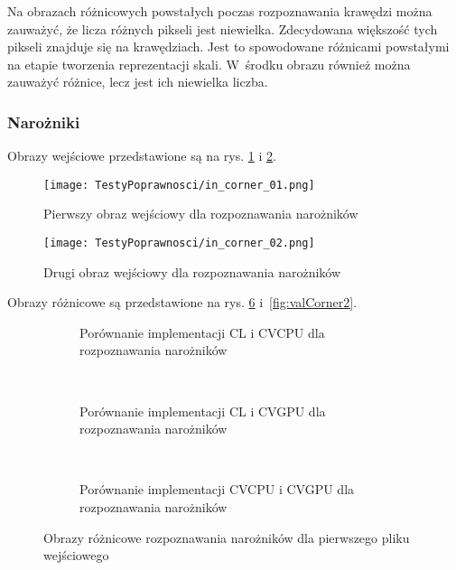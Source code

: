 Na obrazach różnicowych powstałych poczas rozpoznawania krawędzi można zauważyć, że licza różnych pikseli jest niewielka. Zdecydowana większość tych pikseli znajduje się na krawędziach. Jest to spowodowane różnicami powstałymi na etapie tworzenia reprezentacji skali. W~środku obrazu również można zauważyć różnice, lecz jest ich niewielka liczba.

\subsubsection{Narożniki}
\label{subsubsec:naroznikiRysunki}

Obrazy wejściowe przedstawione są na rys. \ref{fig:valCorner01} i \ref{fig:valCorner02}.

\begin{figure}[h]
\begin{center}
\texttt{[image: TestyPoprawnosci/in\_corner\_01.png]}
\end{center}
\caption{Pierwszy obraz wejściowy dla rozpoznawania narożników}
\label{fig:valCorner01}
\end{figure}

\begin{figure}[h]
\begin{center}
\texttt{[image: TestyPoprawnosci/in\_corner\_02.png]}
\end{center}
\caption{Drugi obraz wejściowy dla rozpoznawania narożników}
\label{fig:valCorner02}
\end{figure}

Obrazy różnicowe są przedstawione na rys. \ref{fig:valCorner1} i~\ref{fig:valCorner2}. 

\begin{figure}[h]
\begin{subfigure}[t]{0.3\textwidth}
	\centering
	\setlength\fboxsep{0pt}
	\setlength\fboxrule{0.5pt}
	\caption{Porównanie implementacji CL i CVCPU dla rozpoznawania narożników}
	\label{fig:valCorner1CLCVCPU}
\end{subfigure}
~
\begin{subfigure}[t]{0.3\textwidth}
	\centering
	\setlength\fboxsep{0pt}
	\setlength\fboxrule{0.5pt}
	\caption{Porównanie implementacji CL i CVGPU dla rozpoznawania narożników}
	\label{fig:valCorner1CLCVGPU}
\end{subfigure}
~
\begin{subfigure}[t]{0.3\textwidth}
	\centering
	\setlength\fboxsep{0pt}
	\setlength\fboxrule{0.5pt}
	\caption{Porównanie implementacji CVCPU i CVGPU dla rozpoznawania narożników}
	\label{fig:valCorner1CVCPUCVGPU}                 
\end{subfigure}
\caption{Obrazy różnicowe rozpoznawania narożników dla pierwszego pliku wejściowego}

\label{fig:valCorner1}
\end{figure}

